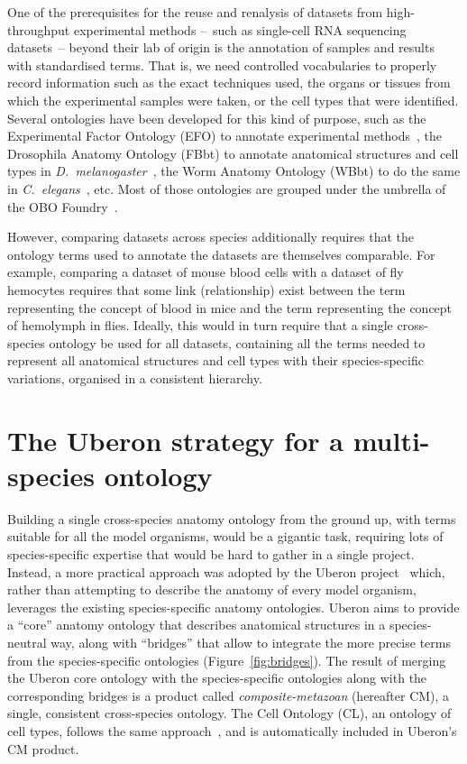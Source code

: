 \documentclass{ceurart}
\def\species#1{\textit{#1}}
\begin{document}
One of the prerequisites for the reuse and renalysis of datasets from
high-throughput experimental methods --~such as single-cell RNA
sequencing datasets~-- beyond their lab of origin is the annotation of
samples and results with standardised terms. That is, we need controlled
vocabularies to properly record information such as the exact techniques
used, the organs or tissues from which the experimental samples were
taken, or the cell types that were identified. Several ontologies have
been developed for this kind of purpose, such as the Experimental Factor
Ontology (EFO) to annotate experimental methods~\cite{malone2010}, the
Drosophila Anatomy Ontology (FBbt) to annotate anatomical structures and
cell types in \species{D.~melanogaster}~\cite{costa2013}, the Worm
Anatomy Ontology (WBbt) to do the same in
\species{C.~elegans}~\cite{lee2003}, etc. Most of those ontologies are
grouped under the umbrella of the OBO Foundry~\cite{jackson2021}.

However, comparing datasets across species additionally requires that
the ontology terms used to annotate the datasets are themselves
comparable. For example, comparing a dataset of mouse blood cells with a
dataset of fly hemocytes requires that some link (relationship) exist
between the term representing the concept of blood in mice and the term
representing the concept of hemolymph in flies. Ideally, this would in
turn require that a single cross-species ontology be used for all
datasets, containing all the terms needed to represent all anatomical
structures and cell types with their species-specific variations,
organised in a consistent hierarchy.

\section{The Uberon strategy for a multi-species ontology}

Building a single cross-species anatomy ontology from the ground up,
with terms suitable for all the model organisms, would be a gigantic
task, requiring lots of species-specific expertise that would be hard to
gather in a single project.  Instead, a more practical approach was
adopted by the Uberon project~\cite{mungall2012a} which, rather than
attempting to describe the anatomy of every model organism, leverages
the existing species-specific anatomy ontologies. Uberon aims to provide
a ``core'' anatomy ontology that describes anatomical structures in a
species-neutral way, along with ``bridges'' that allow to integrate the
more precise terms from the species-specific ontologies
(Figure~\ref{fig:bridges}). The result of merging the Uberon core
ontology with the species-specific ontologies along with the
corresponding bridges is a product called \emph{composite-metazoan}
(hereafter CM), a single, consistent cross-species ontology. The Cell
Ontology (CL), an ontology of cell types, follows the same
approach~\cite{diehl2016}, and is automatically included in Uberon's CM
product.
\end{document}
